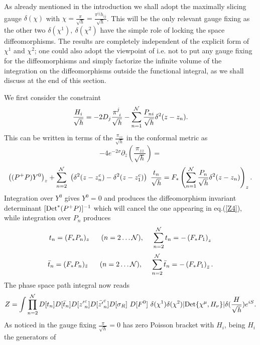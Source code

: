 \documentclass[a4paper,12pt]{article}
\begin{document}
As already mentioned in the introduction we shall adopt the maximally
slicing gauge $\delta(\chi)$ with $\chi=\frac{\pi}{\sqrt
h}=\frac{\pi^{ij}h_{ij}}{\sqrt h}$. This will be the only relevant
gauge fixing as the other two $\delta(\chi^1),~\delta(\chi^2)$ have
the simple role of locking the space diffeomorphisms. The results
are completely independent of the explicit form of $\chi^1$ and
$\chi^2$; one could also adopt the viewpoint of
\cite{alvarez,polchinski,mottola} i.e. not to put any
gauge fixing for the diffeomorphisms and simply factorize the infinite
volume of the integration on the diffeomorphisms outside the
functional integral, as we shall discuss at the end of this section.

We first consider the constraint
\begin{equation}
\frac{H_i}{\sqrt{h}}=-2 D_j\frac{\pi^j_{~i}}{\sqrt h} -
\sum_{n=1}^{\cal N}\frac{P_{ni}}{\sqrt h}\delta^2(z-z_n). 
\end{equation}
This can be written in terms of the
$\displaystyle{\frac{\pi_{zz}}{\sqrt h}}$ in the conformal metric as
$$
-4 e^{-2\sigma}\partial_{\bar z} (\frac{\pi_{zz}}{\sqrt
h})=
$$
\begin{equation}
\left((P^+P)Y^0\right)_z+ 
\sum_{n=2}^{\cal
N}~\left(\delta^2(z-z_n^c)-\delta^2(z-z_1^c)\right)~\frac{t_n}{\sqrt h}=F_*
\left(\sum_{n=1}^{\cal N} \frac{P_n}{\sqrt h}\delta^2(z-z_n)\right)_z.
\end{equation}
Integration over $Y^0$ gives $Y^0=0$ and produces the diffeomorphism
invariant determinant $[{\rm Det}^*(P^+P)]^{-1}$ which will cancel the
one appearing in eq.(\ref{Z4}), while integration over $P_n$
produces
\begin{equation}
t_n = (F_* P_n)_z~~~~~(n=2\dots {\cal N}),~~~~\sum_{n=2}^{\cal N} t_n
= -\left(F_*P_1\right)_z
\end{equation}
\begin{equation}\label{Pntn}
\bar t_n = (F_* P_n)_{\bar z}~~~~~(n=2\dots {\cal
N}),~~~~\sum_{n=2}^{\cal N} \bar t_n = -\left(F_*P_1\right)_{\bar z}.  
\end{equation}
The phase space path integral now reads
\begin{equation}\label{Z5} 
Z= \int 
\prod_{n=2}^{\cal N}D[t_n] D[\bar t_n]D[{z'}^c_n] D[\bar {z'}^c_n] 
D[\sigma_R]~D[F^0]~
\delta(\chi^1)\delta(\chi^2)
|{\rm Det}\{\chi^\mu, H_\nu\}|
\delta(\frac{H}{\sqrt{h}}) 
e^{i S}.
\end{equation}
As noticed in \cite{carlip} the gauge fixing $\frac{\pi}{\sqrt h}=0$
has zero Poisson bracket with $H_i$,  being $H_i$ the generators of
\end{document}
